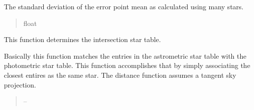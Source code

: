 \documentclass[letterpaper,11pt,english]{sphinxmanual}
\begin{document}
\begin{savenotes}
\begin{fulllineitems}
\begin{savenotes}
\begin{fulllineitems}
\begin{quote}
\begin{description}
\end{description}\end{quote}

\end{fulllineitems}\end{savenotes}


\begin{savenotes}\begin{fulllineitems}
\label{\detokenize{code/opihiexarata.photometry.solution:opihiexarata.photometry.solution.PhotometricSolution.zero_point_error}}
\pysigstartsignatures
{}
\pysigstopsignatures
\sphinxAtStartPar
The standard deviation of the error point mean as calculated using
many stars.
\begin{quote}\begin{description}
\sphinxAtStartPar
float

\end{description}\end{quote}

\end{fulllineitems}\end{savenotes}


\begin{savenotes}\begin{fulllineitems}
\label{\detokenize{code/opihiexarata.photometry.solution:opihiexarata.photometry.solution.PhotometricSolution.__calculate_intersection_star_table}}
\pysigstartsignatures
{}
\pysigstopsignatures
\sphinxAtStartPar
This function determines the intersection star table.

\sphinxAtStartPar
Basically this function matches the entries in the astrometric star
table with the photometric star table. This function accomplishes that
by simply associating the closest entires as the same star. The
distance function assumes a tangent sky projection.
\begin{quote}\begin{description}
\sphinxAtStartPar
{} – 


\end{description}
\end{quote}
\end{fulllineitems}
\end{savenotes}
\end{fulllineitems}
\end{savenotes}
\end{document}

